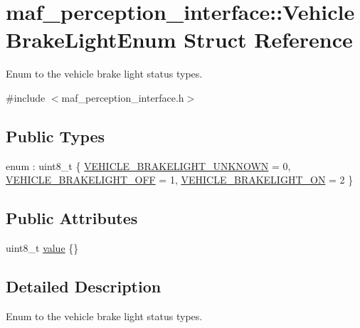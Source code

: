 \hypertarget{structmaf__perception__interface_1_1VehicleBrakeLightEnum}{}\section{maf\+\_\+perception\+\_\+interface\+:\+:Vehicle\+Brake\+Light\+Enum Struct Reference}
\label{structmaf__perception__interface_1_1VehicleBrakeLightEnum}


Enum to the vehicle brake light status types.  




{\ttfamily \#include $<$maf\+\_\+perception\+\_\+interface.\+h$>$}

\subsection*{Public Types}
\begin{DoxyCompactItemize}
\item 
enum \+: uint8\+\_\+t \{ \hyperlink{structmaf__perception__interface_1_1VehicleBrakeLightEnum_a1d24db73ed40be14682968c636fb34bda04c0e5e722f99aa326f364be3070de86}{V\+E\+H\+I\+C\+L\+E\+\_\+\+B\+R\+A\+K\+E\+L\+I\+G\+H\+T\+\_\+\+U\+N\+K\+N\+O\+WN} = 0, 
\hyperlink{structmaf__perception__interface_1_1VehicleBrakeLightEnum_a1d24db73ed40be14682968c636fb34bda50341f26b6e1027fbb57a080954f1fc8}{V\+E\+H\+I\+C\+L\+E\+\_\+\+B\+R\+A\+K\+E\+L\+I\+G\+H\+T\+\_\+\+O\+FF} = 1, 
\hyperlink{structmaf__perception__interface_1_1VehicleBrakeLightEnum_a1d24db73ed40be14682968c636fb34bdafa50b5ef50245c48a5977d741a1ffda5}{V\+E\+H\+I\+C\+L\+E\+\_\+\+B\+R\+A\+K\+E\+L\+I\+G\+H\+T\+\_\+\+ON} = 2
 \}
\end{DoxyCompactItemize}
\subsection*{Public Attributes}
\begin{DoxyCompactItemize}
\item 
uint8\+\_\+t \hyperlink{structmaf__perception__interface_1_1VehicleBrakeLightEnum_a5f04675b2607f3482f5b8364fcbfdfa5}{value} \{\}
\end{DoxyCompactItemize}


\subsection{Detailed Description}
Enum to the vehicle brake light status types. 

